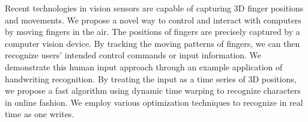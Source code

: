 Recent technologies in vision sensors are capable of capturing 3D finger positions and movements.
We propose a novel way to control and interact with computers by moving fingers in the air. The positions of fingers are precisely captured by a computer vision device. By tracking the moving patterns of fingers, we can then recognize users' intended control commands or input information.  We demonstrate this human input approach through an example application of handwriting recognition.
By treating the input as a time series of 3D positions, we propose a fast algorithm using dynamic time warping to recognize characters in online fashion. We employ various optimization techniques to recognize in real time as one writes.
